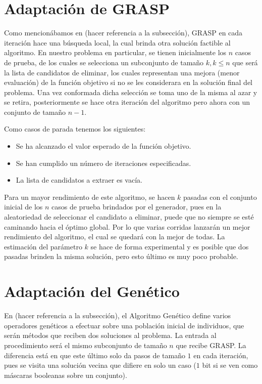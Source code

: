 \documentclass[a4paper,12pt]{book}
\begin{document}
	\section{Adaptación de GRASP}
		Como mencionábamos en (hacer referencia a la subsección), GRASP en cada iteración hace una búsqueda local, la cual brinda otra solución factible al algoritmo. En nuestro problema en particular, se tienen inicialmente los $n$ casos de prueba, de los cuales se selecciona un subconjunto de tamaño $k, k \leq n$ que será la lista de candidatos de eliminar, los cuales representan una mejora (menor evaluación) de la función objetivo si no se les considerara en la solución final del problema. Una vez conformada dicha selección se toma uno de la misma al azar y se retira, posteriormente se hace otra iteración del algoritmo pero ahora con un conjunto de tamaño $n-1$.
		
		Como casos de parada tenemos los siguientes:
		\begin{itemize}
			\item Se ha alcanzado el valor esperado de la función objetivo.
			\item Se han cumplido un número de iteraciones especificadas.
			\item La lista de candidatos a extraer es vacía.
		\end{itemize}
	
		Para un mayor rendimiento de este algoritmo, se hacen $k$ pasadas con el conjunto inicial de los $n$ casos de prueba brindados por el generador, pues en la aleatoriedad de seleccionar el candidato a eliminar, puede que no siempre se esté caminando hacia el óptimo global. Por lo que varias corridas lanzarán un mejor rendimiento del algoritmo, el cual se quedará con la mejor de todas. La estimación del parámetro $k$ se hace de forma experimental y es posible que dos pasadas brinden la misma solución, pero esto último es muy poco probable.
		
	\section{Adaptación del Genético}
		En (hacer referencia a la subsección), el Algoritmo Genético define varios operadores genéticos a efectuar sobre una población inicial de individuos, que serán métodos que reciben dos soluciones al problema. La entrada al procedimiento será el mismo subconjunto de tamaño $n$ que recibe GRASP. La diferencia está en que este último solo da pasos de tamaño $1$ en cada iteración, pues se visita una solución vecina que difiere en solo un caso ($1$ bit si se ven como máscaras booleanas sobre un conjunto).
		
\end{document}
